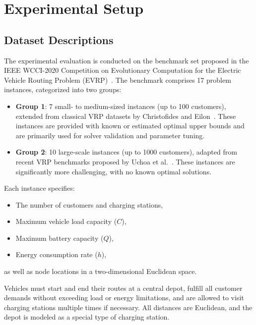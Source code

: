 \section{Experimental Setup}
\subsection{Dataset Descriptions}

The experimental evaluation is conducted on the benchmark set proposed in the IEEE WCCI-2020 Competition on Evolutionary Computation for the Electric Vehicle Routing Problem (EVRP)~\cite{TR-EVRP-Competition}.  
The benchmark comprises 17 problem instances, categorized into two groups:

\begin{itemize}
    \item \textbf{Group 1}: 7 small- to medium-sized instances (up to 100 customers), extended from classical VRP datasets by Christofides and Eilon~\cite{christofides1969}. These instances are provided with known or estimated optimal upper bounds and are primarily used for solver validation and parameter tuning.
    
    \item \textbf{Group 2}: 10 large-scale instances (up to 1000 customers), adapted from recent VRP benchmarks proposed by Uchoa et al.~\cite{uchoa2017}. These instances are significantly more challenging, with no known optimal solutions.
\end{itemize}

Each instance specifies:
\begin{itemize}
    \item The number of customers and charging stations,
    \item Maximum vehicle load capacity ($C$),
    \item Maximum battery capacity ($Q$),
    \item Energy consumption rate ($h$),
\end{itemize}
as well as node locations in a two-dimensional Euclidean space.

Vehicles must start and end their routes at a central depot, fulfill all customer demands without exceeding load or energy limitations, and are allowed to visit charging stations multiple times if necessary.  
All distances are Euclidean, and the depot is modeled as a special type of charging station.

